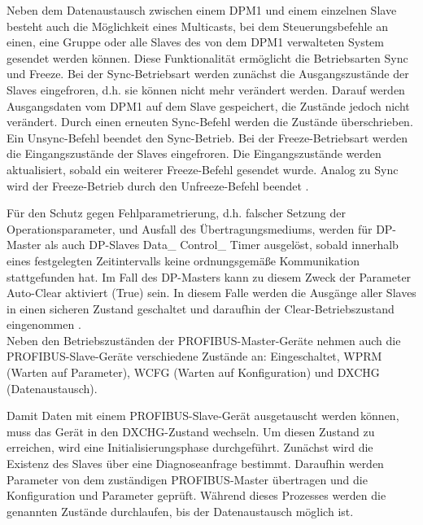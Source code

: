 Neben dem Datenaustausch zwischen einem DPM1 und einem einzelnen Slave besteht auch die Möglichkeit eines Multicasts, bei dem Steuerungsbefehle an einen, eine Gruppe oder alle Slaves des von dem DPM1 verwalteten System gesendet werden können. Diese Funktionalität ermöglicht die Betriebsarten Sync und Freeze. 
Bei der Sync-Betriebsart werden zunächst die Ausgangszustände der Slaves eingefroren, d.h. sie können nicht mehr verändert werden. Darauf werden Ausgangsdaten vom DPM1 auf dem Slave gespeichert, die Zustände jedoch nicht verändert. Durch einen erneuten Sync-Befehl werden die Zustände überschrieben. Ein Unsync-Befehl beendet den Sync-Betrieb.
Bei der Freeze-Betriebsart werden die Eingangszustände der Slaves eingefroren. Die Eingangszustände werden aktualisiert, sobald ein weiterer Freeze-Befehl gesendet wurde. Analog zu Sync wird der Freeze-Betrieb durch den Unfreeze-Befehl beendet \citep{Profibus5}.


Für den Schutz gegen Fehlparametrierung, d.h. falscher Setzung der Operationsparameter, und Ausfall des Übertragungsmediums, werden für DP-Master als auch DP-Slaves \glqq Data\_ Control\_ Timer\grqq{}  ausgelöst, sobald innerhalb eines festgelegten Zeitintervalls keine ordnungsgemäße Kommunikation stattgefunden hat. Im Fall des DP-Masters kann zu diesem Zweck der Parameter \glqq Auto-Clear\grqq{}  aktiviert (True) sein. In diesem Falle werden die Ausgänge aller Slaves in einen sicheren Zustand geschaltet und daraufhin der Clear-Betriebszustand eingenommen \citep{Profibus5}. \\

Neben den Betriebszuständen der PROFIBUS-Master-Geräte nehmen auch die PROFIBUS-Slave-Geräte verschiedene Zustände an: Eingeschaltet, WPRM (Warten auf Parameter), WCFG (Warten auf Konfiguration) und DXCHG (Datenaustausch)\citep{Profibus9}.

Damit Daten mit einem PROFIBUS-Slave-Gerät ausgetauscht werden können, muss das Gerät in den DXCHG-Zustand wechseln. Um diesen Zustand zu erreichen, wird eine Initialisierungsphase durchgeführt. Zunächst wird die Existenz des Slaves über eine Diagnoseanfrage bestimmt. Daraufhin werden Parameter von dem zuständigen PROFIBUS-Master übertragen und die Konfiguration und Parameter geprüft. Während dieses Prozesses werden die genannten Zustände durchlaufen, bis der Datenaustausch möglich ist\citep{Profibus9}.\\

